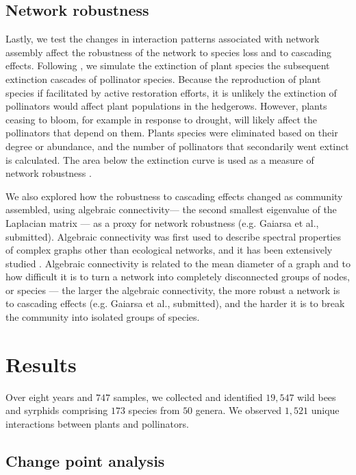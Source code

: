 \documentclass[12pt]{article}
\begin{document}
\subsection*{Network robustness}
Lastly, we test the changes in interaction patterns associated with
network assembly affect the robustness of the network to species loss
and to cascading effects. Following \cite{Memmott2004}, we simulate
the extinction of plant species the subsequent extinction cascades of
pollinator species. Because the reproduction of plant species if
facilitated by active restoration efforts, it is unlikely the
extinction of pollinators would affect plant populations in the
hedgerows. However, plants ceasing to bloom, for example in response
to drought, will likely affect the pollinators that depend on
them. Plants species were eliminated based on their degree or
abundance, and the number of pollinators that secondarily went extinct
is calculated. The area below the extinction curve is used as a
measure of network robustness \citep{bipartite}.

We also explored how the robustness to cascading effects changed as
community assembled, using algebraic connectivity--- the second
smallest eigenvalue of the Laplacian matrix
\citep{fiedler1973algebraic}--- as a proxy for network robustness
(e.g. Gaiarsa et al., submitted). Algebraic connectivity was first
used to describe spectral properties of complex graphs other than
ecological networks, and it has been extensively studied \citep[e.g.,][]{fiedler1973algebraic, costa2007characterization, mohar1991laplacian, de2007old}.   Algebraic connectivity is related to the mean diameter of a graph and to how difficult it is to turn
a network into completely disconnected groups of nodes, or species
\citep{costa2007characterization}--- the larger the algebraic connectivity, the more robust a
network is to cascading effects (e.g. Gaiarsa et al., submitted), and the harder it is to break the community into isolated groups of species.

\section*{Results}
\label{sec:results}

Over eight years and $747$ samples, we collected and identified
$19,547$ wild bees and syrphids comprising $173$ species from $50$
genera. We observed $1,521$ unique interactions between plants and
pollinators.

\subsection*{Change point analysis}
\end{document}
